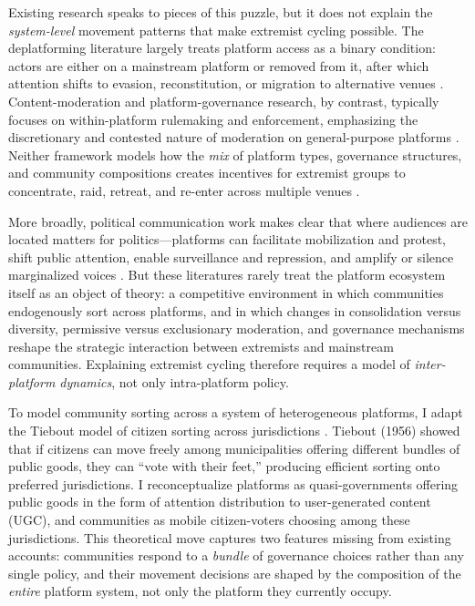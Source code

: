 \documentclass[12pt]{article}
\begin{document}
Existing research speaks to pieces of this puzzle, but it does not explain the \emph{system-level} movement patterns that make extremist cycling possible. The deplatforming literature largely treats platform access as a binary condition: actors are either on a mainstream platform or removed from it, after which attention shifts to evasion, reconstitution, or migration to alternative venues \citep{dehghan2022politicization}. Content-moderation and platform-governance research, by contrast, typically focuses on within-platform rulemaking and enforcement, emphasizing the discretionary and contested nature of moderation on general-purpose platforms \citep{klonick2017new}. Neither framework models how the \emph{mix} of platform types, governance structures, and community compositions creates incentives for extremist groups to concentrate, raid, retreat, and re-enter across multiple venues \citep{lavin2020culture, gais2021encrypted}.

More broadly, political communication work makes clear that where audiences are located matters for politics---platforms can facilitate mobilization and protest, shift public attention, enable surveillance and repression, and amplify or silence marginalized voices \citep{tufekci2017twitter, barberaDistractDivertHow2022, gohdesRepressionTechnologyInternet2020, panHowGovernmentcontrolledMedia2022, reny2021opinion, larson2019social, bonilla2020identity, pan2020saudi}. But these literatures rarely treat the platform ecosystem itself as an object of theory: a competitive environment in which communities endogenously sort across platforms, and in which changes in consolidation versus diversity, permissive versus exclusionary moderation, and governance mechanisms reshape the strategic interaction between extremists and mainstream communities. Explaining extremist cycling therefore requires a model of \emph{inter-platform dynamics}, not only intra-platform policy.

To model community sorting across a system of heterogeneous platforms, I adapt the Tiebout model of citizen sorting across jurisdictions \citep{tiebout1956pure}. Tiebout (1956) showed that if citizens can move freely among municipalities offering different bundles of public goods, they can ``vote with their feet,'' producing efficient sorting onto preferred jurisdictions. I reconceptualize platforms as quasi-governments offering public goods in the form of attention distribution to user-generated content (UGC), and communities as mobile citizen-voters choosing among these jurisdictions. This theoretical move captures two features missing from existing accounts: communities respond to a \emph{bundle} of governance choices rather than any single policy, and their movement decisions are shaped by the composition of the \emph{entire} platform system, not only the platform they currently occupy.
\end{document}
